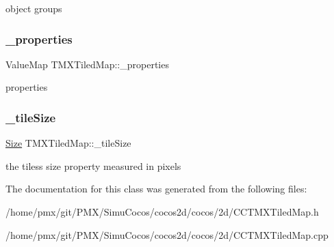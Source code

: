 object groups \mbox{\label{classTMXTiledMap_a83f1a2a8df110f2c755d9a1ae4490f3e}} 
\subsubsection{\texorpdfstring{\+\_\+properties}{\_properties}}
{\footnotesize\ttfamily Value\+Map T\+M\+X\+Tiled\+Map\+::\+\_\+properties\hspace{0.3cm}{\ttfamily [protected]}}

properties \mbox{\label{classTMXTiledMap_ab7f86e9a30c42c0b631651a9096ecea1}} 
\subsubsection{\texorpdfstring{\+\_\+tile\+Size}{\_tileSize}}
{\footnotesize\ttfamily \hyperlink{classSize}{Size} T\+M\+X\+Tiled\+Map\+::\+\_\+tile\+Size\hspace{0.3cm}{\ttfamily [protected]}}

the tiles\textquotesingle{}s size property measured in pixels 

The documentation for this class was generated from the following files\+:\begin{DoxyCompactItemize}
\item 
/home/pmx/git/\+P\+M\+X/\+Simu\+Cocos/cocos2d/cocos/2d/C\+C\+T\+M\+X\+Tiled\+Map.\+h\item 
/home/pmx/git/\+P\+M\+X/\+Simu\+Cocos/cocos2d/cocos/2d/C\+C\+T\+M\+X\+Tiled\+Map.\+cpp\end{DoxyCompactItemize}
